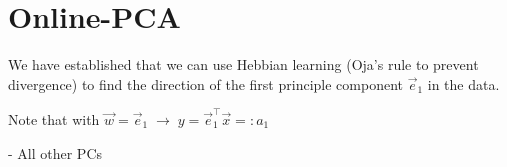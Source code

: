 
\section{Online-PCA}


\begin{frame}
We have established that we can use Hebbian learning (Oja's rule to prevent divergence) 
to find the direction of the first principle component $\vec e_1$ in the data. \\

\pause

Note that with $\vec w = \vec e_1 \; \rightarrow \; y = \vec e_1^\top \vec x =: a_1$\\


\pause

- All other PCs

\end{frame}

